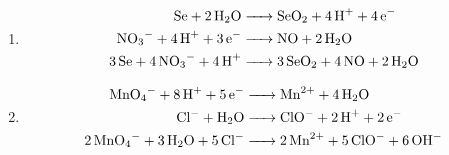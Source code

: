 \documentclass[12pt]{article}
\begin{document}
\begin{enumerate}
  \item {}

    \begin{equation}
      \begin{split}
        \ce{Se + 2H2O ->} & \ce{SeO2 + 4H+ + 4e-}\\
        \ce{NO3- + 4H+ + 3e-  ->} & \ce{NO + 2H2O}\\
        \ce{3Se + 4NO3- + 4H+ ->} & \ce{3SeO2 + 4NO + 2H2O}
      \end{split}
      \label{4}
    \end{equation}

  \item {}

    \begin{equation}
      \begin{split}
        \ce{MnO4- + 8H+ + 5e-  ->} & \ce{Mn^2+ + 4H2O}\\
        \ce{Cl- + H2O ->} & \ce{ClO- + 2H+ + 2e-}\\
        \ce{2MnO4- + 3H2O + 5Cl- ->} & \ce{2Mn^2+ + 5ClO- + 6OH-}
      \end{split}
      \label{5}
    \end{equation}

\end{enumerate}
\end{document}
